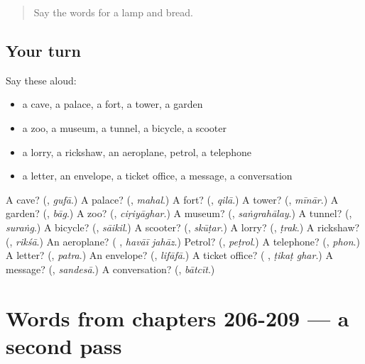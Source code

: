 \begin{quote}
Say the words for a lamp and bread.
\end{quote}

\subsection*{Your turn}
Say these aloud:

\begin{itemize}
\raggedright
  \item a cave, a palace, a fort, a tower, a garden
  \item a zoo, a museum, a tunnel, a bicycle, a scooter
  \item a lorry, a rickshaw, an aeroplane, petrol, a telephone
  \item a letter, an envelope, a ticket office, a message, a conversation
\end{itemize}

\begin{tcolorbox}[breakable,colback=teal!4,colframe=teal!35!black,title={Before you move on}]
A cave? (\textbf{}, \emph{gufā}.) A palace? (\textbf{}, \emph{mahal}.) A fort? (\textbf{}, \emph{qilā}.) A tower? (\textbf{}, \emph{mīnār}.) A garden? (\textbf{}, \emph{bāg}.) A zoo? (\textbf{}, \emph{ciṛiyāghar}.) A museum? (\textbf{}, \emph{saṅgrahālay}.) A tunnel? (\textbf{}, \emph{suraṅg}.) A bicycle? (\textbf{}, \emph{sāikil}.) A scooter? (\textbf{}, \emph{skūṭar}.) A lorry? (\textbf{}, \emph{ṭrak}.) A rickshaw? (\textbf{}, \emph{rikśā}.) An aeroplane? (\textbf{ }, \emph{havāī jahāz}.) Petrol? (\textbf{}, \emph{peṭrol}.) A telephone? (\textbf{}, \emph{phon}.) A letter? (\textbf{}, \emph{patra}.) An envelope? (\textbf{}, \emph{lifāfā}.) A ticket office? (\textbf{ }, \emph{ṭikaṭ ghar}.) A message? (\textbf{}, \emph{sandesā}.) A conversation? (\textbf{}, \emph{bātcīt}.)
\end{tcolorbox}
\section[(dialogue)]{Words from chapters 206-209 — a second pass}

\label{lesson:HI-R209-second-pass-words-from-chapters-206-209}



